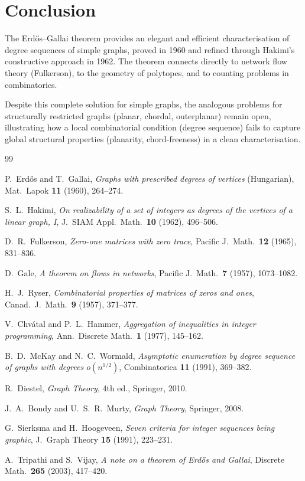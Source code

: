 \documentclass[12pt,a4paper]{amsart}
\theoremstyle{definition}
\theoremstyle{remark}
\begin{document}
\section{Conclusion}

The Erd\H{o}s--Gallai theorem provides an elegant and efficient characterisation
of degree sequences of simple graphs, proved in 1960 and refined through
Hakimi's constructive approach in 1962.
The theorem connects directly to network flow theory (Fulkerson), to the geometry
of polytopes, and to counting problems in combinatorics.

Despite this complete solution for simple graphs, the analogous problems for
structurally restricted graphs (planar, chordal, outerplanar) remain open,
illustrating how a local combinatorial condition (degree sequence) fails to
capture global structural properties (planarity, chord-freeness) in a clean
characterisation.

\begin{thebibliography}{99}

P.\ Erd\H{o}s and T.\ Gallai,
\textit{Graphs with prescribed degrees of vertices} (Hungarian),
Mat.\ Lapok \textbf{11} (1960), 264--274.

S.\ L.\ Hakimi,
\textit{On realizability of a set of integers as degrees of the vertices of a
linear graph, I},
J.\ SIAM Appl.\ Math.\ \textbf{10} (1962), 496--506.

D.\ R.\ Fulkerson,
\textit{Zero-one matrices with zero trace},
Pacific J.\ Math.\ \textbf{12} (1965), 831--836.

D.\ Gale,
\textit{A theorem on flows in networks},
Pacific J.\ Math.\ \textbf{7} (1957), 1073--1082.

H.\ J.\ Ryser,
\textit{Combinatorial properties of matrices of zeros and ones},
Canad.\ J.\ Math.\ \textbf{9} (1957), 371--377.

V.\ Chvátal and P.\ L.\ Hammer,
\textit{Aggregation of inequalities in integer programming},
Ann.\ Discrete Math.\ \textbf{1} (1977), 145--162.

B.\ D.\ McKay and N.\ C.\ Wormald,
\textit{Asymptotic enumeration by degree sequence of graphs with degrees
$o(n^{1/2})$},
Combinatorica \textbf{11} (1991), 369--382.

R.\ Diestel,
\textit{Graph Theory},
4th ed., Springer, 2010.

J.\ A.\ Bondy and U.\ S.\ R.\ Murty,
\textit{Graph Theory},
Springer, 2008.

G.\ Sierksma and H.\ Hoogeveen,
\textit{Seven criteria for integer sequences being graphic},
J.\ Graph Theory \textbf{15} (1991), 223--231.

A.\ Tripathi and S.\ Vijay,
\textit{A note on a theorem of Erd\H{o}s and Gallai},
Discrete Math.\ \textbf{265} (2003), 417--420.

\end{thebibliography}
\end{document}
